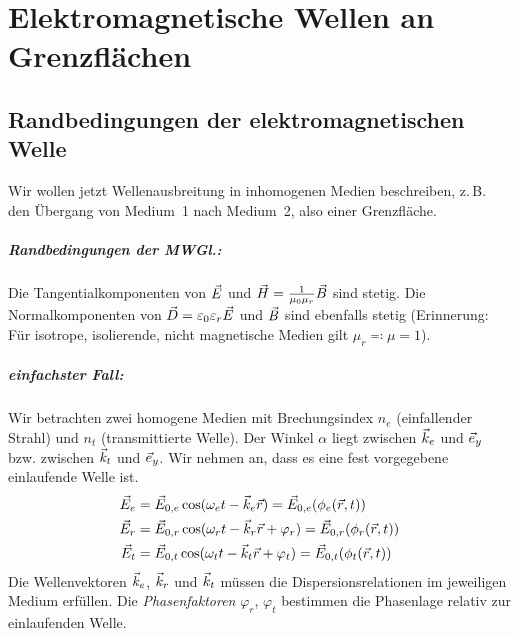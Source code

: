 




\chapter{Elektromagnetische Wellen an Grenzflächen}
\section{Randbedingungen der elektromagnetischen Welle}
Wir wollen jetzt Wellenausbreitung in inhomogenen Medien beschreiben,
z.\,B. den Übergang von Medium~1 nach Medium~2, also einer
Grenzfläche.

\paragraph{Randbedingungen der MWGl.:} Die Tangentialkomponenten von
$\vec{E}$ und $\vec{H}=\frac{1}{\mu_0\mu_r}\vec{B}$ sind stetig. Die
Normalkomponenten von $\vec{D}=\varepsilon_0\varepsilon_r\vec{E}$ und $\vec{B}$ sind
ebenfalls stetig (Erinnerung: Für isotrope, isolierende, nicht
magnetische Medien gilt $\mu_r\eqqcolon\mu=1$).
\paragraph{einfachster Fall:} Wir betrachten zwei homogene Medien mit
Brechungsindex $n_e$ (einfallender Strahl) und $n_t$ (transmittierte
Welle).
%
%
Der Winkel $\alpha$ liegt zwischen $\vec{k}_e$ und $\vec{e}_y$
bzw. zwischen $\vec{k}_t$ und $\vec{e}_y$. Wir nehmen an, dass es eine
fest vorgegebene einlaufende Welle ist.
\begin{align*}
  \vec{E}_e &= \vec{E}_{0,e}\cos(\omega_et-\vec{k}_e\vec{r})
            =\vec{E}_{0,e}(\phi_e(\vec{r},t))\\
  \vec{E}_r &= \vec{E}_{0,r}\cos(\omega_rt - \vec{k}_r\vec{r}+\varphi_r)
            =\vec{E}_{0,r}(\phi_r(\vec{r},t))\\
  \vec{E}_t &= \vec{E}_{0,t}\cos(\omega_tt - \vec{k}_t\vec{r} + \varphi_t)
            =\vec{E}_{0,t}(\phi_t(\vec{r},t))
\end{align*}
Die Wellenvektoren $\vec{k}_e$, $\vec{k}_r$ und $\vec{k}_t$ müssen die%
%
%
Dispersionsrelationen im jeweiligen Medium erfüllen. Die
\emph{Phasenfaktoren}
$\varphi_r$, $\varphi_t$%
%
bestimmen die Phasenlage relativ zur einlaufenden Welle.

